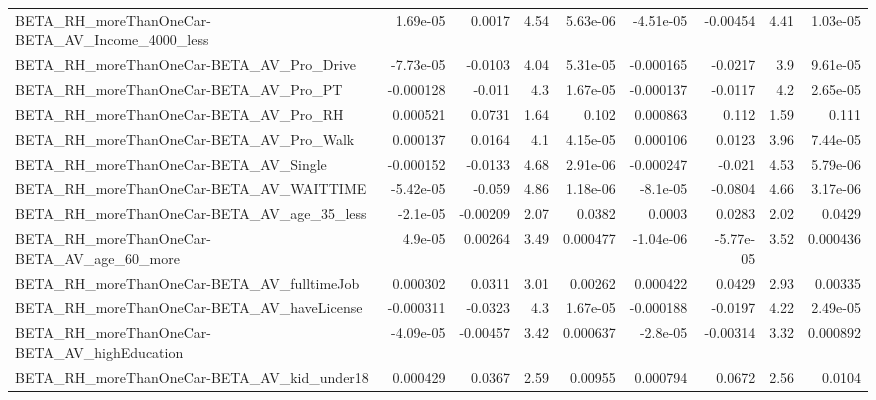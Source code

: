 \begin{tabular}{lrrrrrrrr}
BETA\_RH\_moreThanOneCar-BETA\_AV\_Income\_4000\_less    &    1.69e-05 &       0.0017 &      4.54 & 5.63e-06 &  -4.51e-05 &    -0.00454 &         4.41 &      1.03e-05 \\
BETA\_RH\_moreThanOneCar-BETA\_AV\_Pro\_Drive           &   -7.73e-05 &      -0.0103 &      4.04 & 5.31e-05 &  -0.000165 &     -0.0217 &          3.9 &      9.61e-05 \\
BETA\_RH\_moreThanOneCar-BETA\_AV\_Pro\_PT              &   -0.000128 &       -0.011 &       4.3 & 1.67e-05 &  -0.000137 &     -0.0117 &          4.2 &      2.65e-05 \\
BETA\_RH\_moreThanOneCar-BETA\_AV\_Pro\_RH              &    0.000521 &       0.0731 &      1.64 &    0.102 &   0.000863 &       0.112 &         1.59 &         0.111 \\
BETA\_RH\_moreThanOneCar-BETA\_AV\_Pro\_Walk            &    0.000137 &       0.0164 &       4.1 & 4.15e-05 &   0.000106 &      0.0123 &         3.96 &      7.44e-05 \\
BETA\_RH\_moreThanOneCar-BETA\_AV\_Single              &   -0.000152 &      -0.0133 &      4.68 & 2.91e-06 &  -0.000247 &      -0.021 &         4.53 &      5.79e-06 \\
BETA\_RH\_moreThanOneCar-BETA\_AV\_WAITTIME            &   -5.42e-05 &       -0.059 &      4.86 & 1.18e-06 &   -8.1e-05 &     -0.0804 &         4.66 &      3.17e-06 \\
BETA\_RH\_moreThanOneCar-BETA\_AV\_age\_35\_less         &    -2.1e-05 &     -0.00209 &      2.07 &   0.0382 &     0.0003 &      0.0283 &         2.02 &        0.0429 \\
BETA\_RH\_moreThanOneCar-BETA\_AV\_age\_60\_more         &     4.9e-05 &      0.00264 &      3.49 & 0.000477 &  -1.04e-06 &   -5.77e-05 &         3.52 &      0.000436 \\
BETA\_RH\_moreThanOneCar-BETA\_AV\_fulltimeJob         &    0.000302 &       0.0311 &      3.01 &  0.00262 &   0.000422 &      0.0429 &         2.93 &       0.00335 \\
BETA\_RH\_moreThanOneCar-BETA\_AV\_haveLicense         &   -0.000311 &      -0.0323 &       4.3 & 1.67e-05 &  -0.000188 &     -0.0197 &         4.22 &      2.49e-05 \\
BETA\_RH\_moreThanOneCar-BETA\_AV\_highEducation       &   -4.09e-05 &     -0.00457 &      3.42 & 0.000637 &   -2.8e-05 &    -0.00314 &         3.32 &      0.000892 \\
BETA\_RH\_moreThanOneCar-BETA\_AV\_kid\_under18         &    0.000429 &       0.0367 &      2.59 &  0.00955 &   0.000794 &      0.0672 &         2.56 &        0.0104 \\

\end{tabular}
